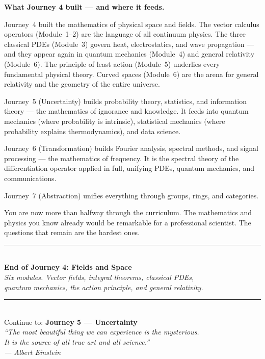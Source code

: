 \documentclass[12pt,a4paper]{article}
\begin{document}
\vspace{0.8cm}
\begin{namebox}
\textbf{What Journey 4 built --- and where it feeds.}

\medskip
Journey~4 built the mathematics of physical space and fields. The vector calculus operators (Module~1--2) are the language of all continuum physics. The three classical PDEs (Module~3) govern heat, electrostatics, and wave propagation --- and they appear again in quantum mechanics (Module~4) and general relativity (Module~6). The principle of least action (Module~5) underlies every fundamental physical theory. Curved spaces (Module~6) are the arena for general relativity and the geometry of the entire universe.

\medskip
Journey~5 (Uncertainty) builds probability theory, statistics, and information theory --- the mathematics of ignorance and knowledge. It feeds into quantum mechanics (where probability is intrinsic), statistical mechanics (where probability explains thermodynamics), and data science.

Journey~6 (Transformation) builds Fourier analysis, spectral methods, and signal processing --- the mathematics of frequency. It is the spectral theory of the differentiation operator applied in full, unifying PDEs, quantum mechanics, and communications.

Journey~7 (Abstraction) unifies everything through groups, rings, and categories.

\medskip
You are now more than halfway through the curriculum. The mathematics and physics you know already would be remarkable for a professional scientist. The questions that remain are the hardest ones.
\end{namebox}

\vspace{1cm}
\begin{center}
{\color{Gold}\rule{0.6\linewidth}{1.2pt}}\\[8pt]
{\large\bfseries\color{NavyBlue}End of Journey 4: Fields and Space}\\[6pt]
{\normalsize\color{DarkGrey}\itshape Six modules. Vector fields, integral theorems, classical PDEs,\\
quantum mechanics, the action principle, and general relativity.}\\[10pt]
{\color{Gold}\rule{0.6\linewidth}{1.2pt}}\\[10pt]
{\small\color{DarkGrey}Continue to: \textbf{Journey 5 --- Uncertainty}}\\[4pt]
{\small\color{DarkGrey}\itshape ``The most beautiful thing we can experience is the mysterious.\\
It is the source of all true art and all science.''\\
\upshape --- Albert Einstein}
\end{center}
\end{document}
